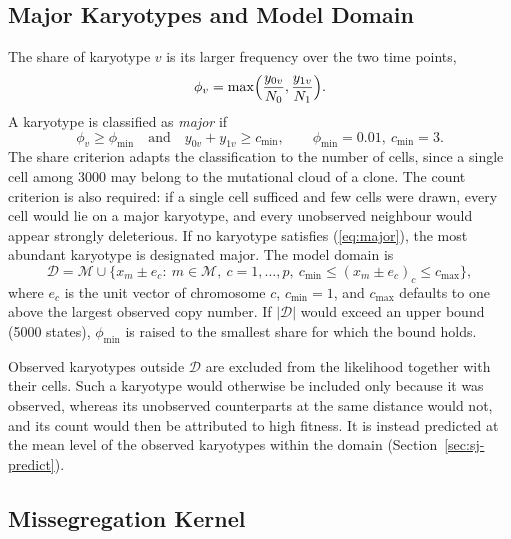\documentclass[11pt]{article}
\begin{document}
\subsection{Major Karyotypes and Model Domain}
\label{sec:sj-domain}

The share of karyotype $v$ is its larger frequency over the two time points,
\begin{equation}
  \phi_v=\max\Bigl(\frac{y_{0v}}{N_0},\frac{y_{1v}}{N_1}\Bigr).
  \label{eq:share}
\end{equation}
A karyotype is classified as \emph{major} if
\begin{equation}
  \phi_v\ge\phi_{\min}\quad\text{and}\quad y_{0v}+y_{1v}\ge c_{\min},
  \qquad \phi_{\min}=0.01,\ c_{\min}=3 .
  \label{eq:major}
\end{equation}
The share criterion adapts the classification to the number of cells, since a
single cell among 3000 may belong to the mutational cloud of a clone.
The count criterion is also required: if a single cell sufficed and few cells
were drawn, every cell would lie on a major karyotype, and every unobserved neighbour
would appear strongly deleterious. If no karyotype satisfies
(\ref{eq:major}), the most abundant karyotype is designated major. The model
domain is
\begin{equation}
  \mathcal{D}=\mathcal{M}\cup\bigl\{x_m\pm e_c:\ m\in\mathcal{M},\
  c=1,\ldots,p,\ c_{\min}\le(x_m\pm e_c)_c\le c_{\max}\bigr\},
  \label{eq:domain}
\end{equation}
where $e_c$ is the unit vector of chromosome $c$, $c_{\min}=1$, and
$c_{\max}$ defaults to one above the largest observed copy number. If
$|\mathcal{D}|$ would exceed an upper bound (5000 states), $\phi_{\min}$ is
raised to the smallest share for which the bound holds.

Observed karyotypes outside $\mathcal{D}$ are excluded from the likelihood
together with their cells. Such a karyotype would otherwise be included only
because it was observed, whereas its unobserved counterparts at the same
distance would not, and its count would then be attributed to high fitness.
It is instead predicted at the mean level of the observed karyotypes within
the domain (Section~\ref{sec:sj-predict}).

\subsection{Missegregation Kernel}
\label{sec:sj-division}
\end{document}

